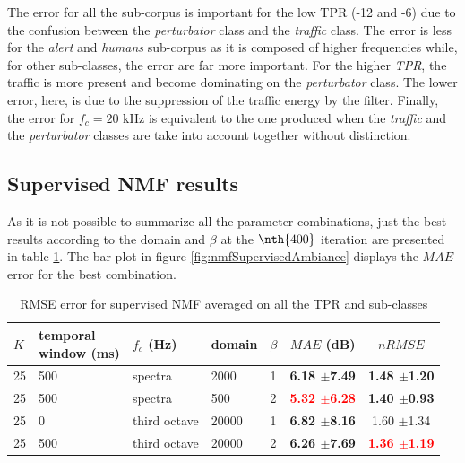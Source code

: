 \documentclass[twocolumn,a4paper,10pt]{article}
\begin{document}
The error for all the sub-corpus is important for the low TPR (-12 and -6) due to the confusion between the \textit{perturbator} class and the \textit{traffic} class. The error is less for the \textit{alert} and \textit{humans} sub-corpus as it is composed of higher frequencies while, for other sub-classes, the error are far more important. For the higher \textit{TPR}, the traffic is more present and become dominating on the \textit{perturbator} class. The lower error, here, is due to the suppression of the traffic energy by the filter. Finally, the error for $f_c = 20$ kHz is equivalent to the one produced when the \textit{traffic} and the \textit{perturbator} classes are take into account together without distinction. 

\subsection{Supervised NMF results}

As it is not possible to summarize all the parameter combinations, just the best results according to the domain and $\beta$ at the $\nth{400}$ iteration are presented in table \ref{tab:results_supervised}. The bar plot in figure \ref{fig:nmfSupervisedAmbiance} displays the $MAE$ error for the best combination.\\

\begin{table}[t]
\centering
\begin{tabular}{lllllcc} 
$K$ & \shortstack{temporal\\window (ms)} & $f_c$ (Hz) & domain & $\beta$ & $MAE$ (dB) & $nRMSE$ \\ 
\hline 
 25 & 500 & spectra &  2000 & 1 & \textbf{6.18 $\pm$7.49} & \textbf{1.48 $\pm$1.20} \\ 
 25 & 500 & spectra &   500 & 2 & \textbf{\textcolor{red}{5.32 $\pm$6.28}} & \textbf{1.40 $\pm$0.93} \\ 
 25 & 0 & third octave & 20000 & 1 & \textbf{6.82 $\pm$8.16} & 1.60 $\pm$1.34\\ 
 25 & 500 & third octave & 20000 & 2 & \textbf{6.26 $\pm$7.69} & \textbf{\textcolor{red}{1.36 $\pm$1.19}} \\ 
\end{tabular} 
\caption{RMSE error for supervised NMF averaged on all the TPR and sub-classes}
\label{tab:results_supervised}
\end{table}
\end{document}
